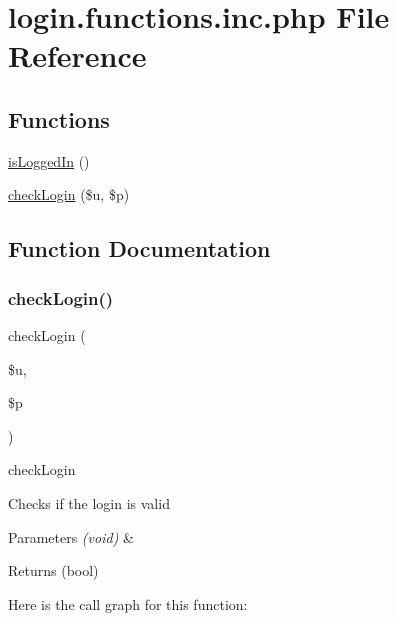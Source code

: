 \hypertarget{login_8functions_8inc_8php}{}\section{login.\+functions.\+inc.\+php File Reference}
\label{login_8functions_8inc_8php}
\subsection*{Functions}
\begin{DoxyCompactItemize}
\item 
\hyperlink{login_8functions_8inc_8php_a33bdd79e5da367ebddd4cfbdbbfc7cff}{is\+Logged\+In} ()
\item 
\hyperlink{login_8functions_8inc_8php_a546bc234c9dde6443b3fd7efca444d74}{check\+Login} (\$u, \$p)
\end{DoxyCompactItemize}


\subsection{Function Documentation}
\mbox{\label{login_8functions_8inc_8php_a546bc234c9dde6443b3fd7efca444d74}} 
\subsubsection{\texorpdfstring{check\+Login()}{checkLogin()}}
{\footnotesize\ttfamily check\+Login (\begin{DoxyParamCaption}\item[{}]{\$u,  }\item[{}]{\$p }\end{DoxyParamCaption})}

check\+Login

Checks if the login is valid


\begin{DoxyParams}{Parameters}
{\em (void)} & \\
\hline
\end{DoxyParams}
\begin{DoxyReturn}{Returns}
(bool) 
\end{DoxyReturn}
Here is the call graph for this function\+:

